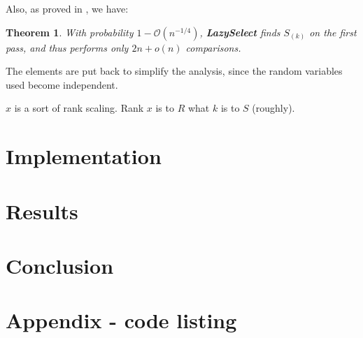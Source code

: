 \documentclass[12pt,a4paper]{article}
\newtheorem{theorem}{Theorem}
\begin{document}
Also, as proved in \cite[p.~49]{motwani}, we have:

\begin{mdframed}
  \begin{theorem}
    With probability $1 - \mathcal{O}(n^{-1/4})$,
    \textbf{\textup{LazySelect}} finds $S_{(k)}$ on the first pass,
    and thus performs only $2n + o(n)$ comparisons.
    \label{theo1}
  \end{theorem}
\end{mdframed}


The elements are put back to simplify the analysis, since the random
variables used become independent.

$x$ is a sort of rank scaling. Rank $x$ is to $R$ what $k$ is to $S$
(roughly).




\section[Implementation]{Implementation}




\section{Results}

\section{Conclusion}

\nocite{*}




\appendix
\section{Appendix - code listing}

\inputminted[label=core.clj]{clojure}{../src/lazy_selection/core.clj}
\end{document}
